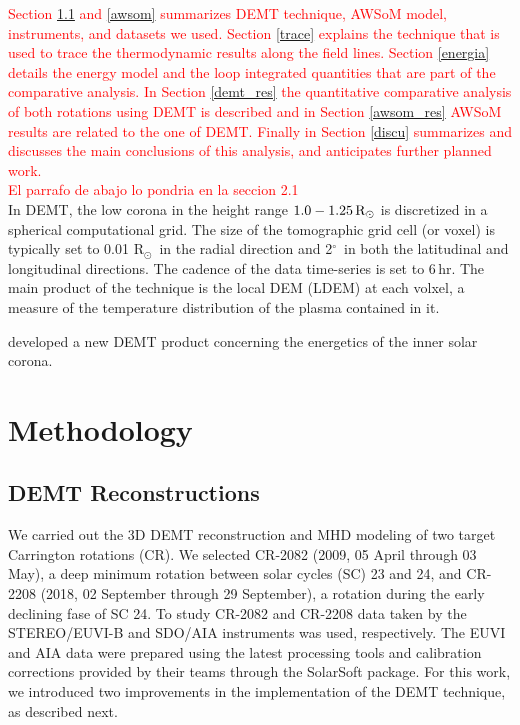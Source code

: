 \documentclass[namedreferences]{solarphysics}
\renewcommand{\deg}{$^\circ$}
\newcommand{\rsun}{R{$_\odot$}}
\newcommand{\mrsun}{{\rm R_\odot}}
\def\diego#1{\textcolor{red}{#1}}
\begin{document}
\begin{article}
{\diego{
Section \ref{demt} and \ref{awsom} summarizes DEMT technique, AWSoM model, instruments, and datasets we used. Section \ref{trace} explains the technique that is used to trace the thermodynamic results along the field lines. Section \ref{energia} details the energy model and the loop integrated quantities that are part of the comparative analysis. In Section \ref{demt_res} the quantitative comparative analysis of both rotations using DEMT is described and in Section \ref{awsom_res} AWSoM results are related to the one of DEMT. Finally in Section \ref{discu} summarizes and discusses the main conclusions of this analysis, and anticipates further planned work.
}
\\
\diego{El parrafo de abajo lo pondria en la seccion 2.1}\\
In DEMT, the low corona in the height range $1.0-1.25\,\mrsun$ is discretized in a spherical computational grid. The size of the tomographic grid cell (or voxel) is typically set to 0.01 \rsun \ in the radial direction and 2\deg\ in both the latitudinal and longitudinal directions. The cadence of the data time-series is set to 6\,hr. The main product of the technique is the local DEM (LDEM) at each volxel, a measure of the temperature distribution of the plasma contained in it. 


\citet{maccormack_2017} developed a new DEMT product concerning the energetics of the inner solar corona.}

\section{Methodology}\label{meto}   

\subsection{{DEMT Reconstructions}}\label{demt}

{We carried out the 3D DEMT reconstruction and MHD modeling of two target Carrington rotations (CR). We selected CR-2082 (2009, 05 April through 03 May), a deep minimum rotation between solar cycles (SC) 23 and 24, and CR-2208 (2018, 02 September through 29 September), a rotation during the early declining fase of SC 24. To study CR-2082 and CR-2208 data taken by the STEREO/EUVI-B and SDO/AIA instruments was used, respectively. The EUVI and AIA data were prepared using the latest processing tools and calibration corrections provided by their teams through the SolarSoft package. For this work, we introduced two improvements in the implementation of the DEMT technique, as described next.}


\end{article}
\end{document}
